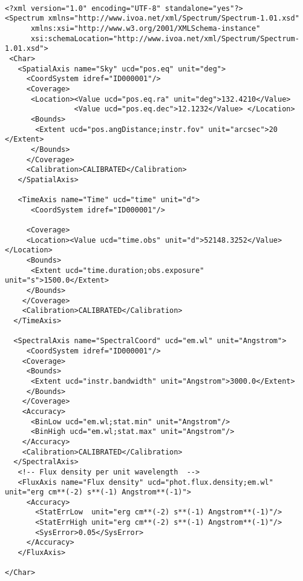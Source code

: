 

{ \footnotesize
\begin{flushleft}


\begin{fmpage}

\begin{verbatim}

<?xml version="1.0" encoding="UTF-8" standalone="yes"?>
<Spectrum xmlns="http://www.ivoa.net/xml/Spectrum/Spectrum-1.01.xsd"
      xmlns:xsi="http://www.w3.org/2001/XMLSchema-instance" 
      xsi:schemaLocation="http://www.ivoa.net/xml/Spectrum/Spectrum-1.01.xsd">
 <Char>
   <SpatialAxis name="Sky" ucd="pos.eq" unit="deg">
     <CoordSystem idref="ID000001"/>     
     <Coverage>
      <Location><Value ucd="pos.eq.ra" unit="deg">132.4210</Value>
                <Value ucd="pos.eq.dec">12.1232</Value> </Location>
      <Bounds>
       <Extent ucd="pos.angDistance;instr.fov" unit="arcsec">20   </Extent>
      </Bounds>
     </Coverage>
     <Calibration>CALIBRATED</Calibration>
   </SpatialAxis>

   <TimeAxis name="Time" ucd="time" unit="d">
      <CoordSystem idref="ID000001"/>
     
     <Coverage>
     <Location><Value ucd="time.obs" unit="d">52148.3252</Value></Location>
     <Bounds>
      <Extent ucd="time.duration;obs.exposure" unit="s">1500.0</Extent>
     </Bounds>
    </Coverage>
    <Calibration>CALIBRATED</Calibration>
  </TimeAxis>

  <SpectralAxis name="SpectralCoord" ucd="em.wl" unit="Angstrom">
     <CoordSystem idref="ID000001"/>     
    <Coverage>
     <Bounds>
      <Extent ucd="instr.bandwidth" unit="Angstrom">3000.0</Extent>
     </Bounds>
    </Coverage>
    <Accuracy>
      <BinLow ucd="em.wl;stat.min" unit="Angstrom"/>
      <BinHigh ucd="em.wl;stat.max" unit="Angstrom"/>
    </Accuracy>
    <Calibration>CALIBRATED</Calibration>
  </SpectralAxis>
   <!-- Flux density per unit wavelength  -->
   <FluxAxis name="Flux density" ucd="phot.flux.density;em.wl" unit="erg cm**(-2) s**(-1) Angstrom**(-1)">
     <Accuracy>
       <StatErrLow  unit="erg cm**(-2) s**(-1) Angstrom**(-1)"/>
       <StatErrHigh unit="erg cm**(-2) s**(-1) Angstrom**(-1)"/>
       <SysError>0.05</SysError>
     </Accuracy>
   </FluxAxis>

</Char>

\end{verbatim}
\end{fmpage}

\begin{fmpage}
\begin{verbatim}


\end{verbatim}
\end{fmpage}
\end{flushleft}}
